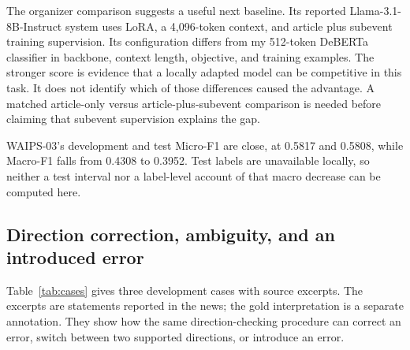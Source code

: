 \documentclass[12pt,a4paper]{article}
\begin{document}
The organizer comparison suggests a useful next baseline. Its reported Llama-3.1-8B-Instruct system uses LoRA, a 4,096-token context, and article plus subevent training supervision. Its configuration differs from my 512-token DeBERTa classifier in backbone, context length, objective, and training examples. The stronger score is evidence that a locally adapted model can be competitive in this task. It does not identify which of those differences caused the advantage. A matched article-only versus article-plus-subevent comparison is needed before claiming that subevent supervision explains the gap.

WAIPS-03's development and test Micro-F1 are close, at 0.5817 and 0.5808, while Macro-F1 falls from 0.4308 to 0.3952. Test labels are unavailable locally, so neither a test interval nor a label-level account of that macro decrease can be computed here.

\subsection{Direction correction, ambiguity, and an introduced error}
Table~\ref{tab:cases} gives three development cases with source excerpts. The excerpts are statements reported in the news; the gold interpretation is a separate annotation. They show how the same direction-checking procedure can correct an error, switch between two supported directions, or introduce an error.
\end{document}
